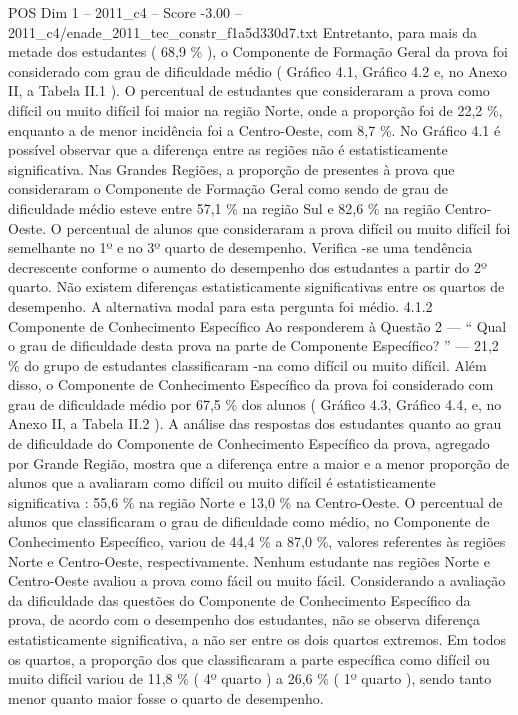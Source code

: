 \begin{textsample}{POS Dim 1 – 2011\_c4 – Score -3.00 – 2011\_c4/enade\_2011\_tec\_constr\_f1a5d330d7.txt}
Entretanto, para mais da metade dos estudantes ( 68,9 \% ), o Componente de Formação Geral da prova foi considerado com grau de dificuldade médio ( Gráfico 4.1, Gráfico 4.2 e, no Anexo II, a Tabela II.1 ).
O percentual de estudantes que consideraram a prova como difícil ou muito difícil foi maior na região Norte, onde a proporção foi de 22,2 \%, enquanto a de menor incidência foi a Centro-Oeste, com 8,7 \%.
No Gráfico 4.1 é possível observar que a diferença entre as regiões não é estatisticamente significativa.
Nas Grandes Regiões, a proporção de presentes à prova que consideraram o Componente de Formação Geral como sendo de grau de dificuldade médio esteve entre 57,1 \% na região Sul e 82,6 \% na região Centro-Oeste.
O percentual de alunos que consideraram a prova difícil ou muito difícil foi semelhante no 1º e no 3º quarto de desempenho.
Verifica -se uma tendência decrescente conforme o aumento do desempenho dos estudantes a partir do 2º quarto.
Não existem diferenças estatisticamente significativas entre os quartos de desempenho.
A alternativa modal para esta pergunta foi médio. 4.1.2 Componente de Conhecimento Específico Ao responderem à Questão 2 — “ Qual o grau de dificuldade desta prova na parte de Componente Específico? ” — 21,2 \% do grupo de estudantes classificaram -na como difícil ou muito difícil.
Além disso, o Componente de Conhecimento Específico da prova foi considerado com grau de dificuldade médio por 67,5 \% dos alunos ( Gráfico 4.3, Gráfico 4.4, e, no Anexo II, a Tabela II.2 ).
A análise das respostas dos estudantes quanto ao grau de dificuldade do Componente de Conhecimento Específico da prova, agregado por Grande Região, mostra que a diferença entre a maior e a menor proporção de alunos que a avaliaram como difícil ou muito difícil é estatisticamente significativa : 55,6 \% na região Norte e 13,0 \% na Centro-Oeste.
O percentual de alunos que classificaram o grau de dificuldade como médio, no Componente de Conhecimento Específico, variou de 44,4 \% a 87,0 \%, valores referentes às regiões Norte e Centro-Oeste, respectivamente.
Nenhum estudante nas regiões Norte e Centro-Oeste avaliou a prova como fácil ou muito fácil.
Considerando a avaliação da dificuldade das questões do Componente de Conhecimento Específico da prova, de acordo com o desempenho dos estudantes, não se observa diferença estatisticamente significativa, a não ser entre os dois quartos extremos.
Em todos os quartos, a proporção dos que classificaram a parte específica como difícil ou muito difícil variou de 11,8 \% ( 4º quarto ) a 26,6 \% ( 1º quarto ), sendo tanto menor quanto maior fosse o quarto de desempenho.

\end{textsample}
